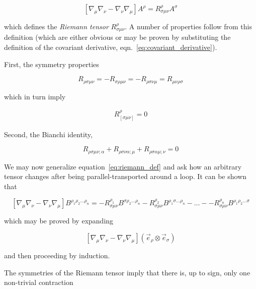 \begin{equation}
\label{eq:riemann_def}
\left[\nabla_\mu \nabla_\nu - \nabla_\nu \nabla_\mu\right] A^\rho
= R^\rho_{\sigma\mu\nu} A^\sigma
\end{equation}

which defines the \emph{Riemann tensor} $R^\rho_{\sigma\mu\nu}$.  A
number of properties follow from this definition (which are either
obvious or may be proven by substituting the definition of the
covariant derivative, eqn.~\ref{eq:covariant_derivative}).

First, the symmetry properties

\begin{equation}
\label{eq:symmetries}
R_{\rho\sigma\mu\nu}
= -R_{\sigma\rho\mu\nu}
= -R_{\rho\sigma\nu\mu}
= R_{\mu\nu\rho\sigma}
\end{equation}

which in turn imply

\begin{align}
R^\rho_{[\sigma\mu\nu]} = 0
\end{align}

Second, the Bianchi identity,

\begin{equation}
\label{eq:bianchi}
R_{\rho\sigma\mu\nu;\alpha}
+R_{\rho\sigma\nu\alpha;\mu}
+R_{\rho\sigma\alpha\mu;\nu} = 0
\end{equation}

We may now generalize equation~\ref{eq:riemann_def} and ask how an
arbitrary tensor changes after being parallel-transported 
around a loop.  It can be shown that

\begin{equation}
\label{eq:higher_order_riemann}
\left[\nabla_\mu \nabla_\nu - \nabla_\nu \nabla_\mu\right] 
B^{\rho_1 \rho_2 \ldots \rho_n}
= - R^{\rho_1}_{\sigma \mu\nu} B^{\sigma \rho_2 \ldots \rho_n}
- R^{\rho_2}_{\sigma \mu\nu} B^{\rho_1 \sigma \ldots \rho_n}
- \ldots -
- R^{\rho_n}_{\sigma \mu\nu} B^{\rho_1 \rho_2 \ldots \sigma }
\end{equation}

which may be proved by expanding

\begin{equation*}
\left[\nabla_\mu \nabla_\nu - \nabla_\nu \nabla_\mu\right] 
(\vec{e}_\rho \otimes \vec{e}_\sigma)
\end{equation*}

and then proceeding by induction.  

The symmetries of the Riemann tensor imply that there is, up to sign,
only one non-trivial contraction

